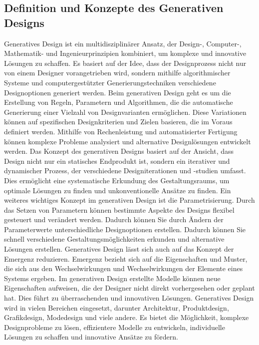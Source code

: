 \subsection*{Definition und Konzepte des Generativen Designs}
Generatives Design ist ein multidisziplinärer Ansatz, der Design-, Computer-, Mathematik- und Ingenieurprinzipien kombiniert, um komplexe und innovative Lösungen zu schaffen. Es basiert auf der Idee, dass der Designprozess nicht nur von einem  Designer vorangetrieben wird, sondern mithilfe algorithmischer Systeme und computergestützter Generierungstechniken verschiedene Designoptionen generiert werden. 
 Beim generativen Design geht es um  die Erstellung von Regeln, Parametern und Algorithmen, die die automatische Generierung einer Vielzahl von Designvarianten ermöglichen. Diese Variationen können auf spezifischen Designkriterien und Zielen basieren, die im Voraus definiert werden. Mithilfe von Rechenleistung und automatisierter Fertigung können komplexe Probleme analysiert und alternative Designlösungen entwickelt werden.  Das Konzept des generativen Designs basiert auf der Ansicht, dass  Design nicht nur ein statisches Endprodukt ist, sondern ein iterativer und dynamischer Prozess, der verschiedene Designiterationen und -studien umfasst. Dies ermöglicht eine systematische Erkundung des Gestaltungsraums, um optimale Lösungen zu finden und unkonventionelle Ansätze zu finden. 
 Ein weiteres wichtiges Konzept im generativen Design ist die Parametrisierung. Durch das Setzen von Parametern können bestimmte Aspekte des Designs flexibel gesteuert und verändert werden. Dadurch können Sie durch Ändern der Parameterwerte unterschiedliche Designoptionen erstellen. Dadurch können Sie schnell verschiedene Gestaltungsmöglichkeiten erkunden und alternative Lösungen erstellen. 
 Generatives Design lässt sich auch auf das Konzept der Emergenz reduzieren. Emergenz bezieht sich auf die Eigenschaften und Muster, die sich aus den Wechselwirkungen und Wechselwirkungen der Elemente eines Systems ergeben. Im generativen Design erstellte Modelle können neue Eigenschaften aufweisen, die der Designer nicht direkt  vorhergesehen oder geplant hat. Dies führt zu überraschenden und innovativen Lösungen.  Generatives Design wird in vielen Bereichen eingesetzt, darunter Architektur, Produktdesign, Grafikdesign, Modedesign und viele andere. Es bietet die Möglichkeit, komplexe Designprobleme zu lösen, effizientere Modelle zu entwickeln, individuelle Lösungen zu schaffen und innovative Ansätze zu fördern.

